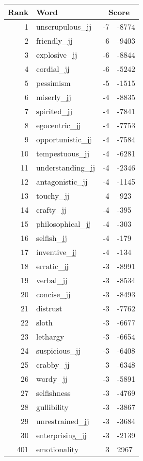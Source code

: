 \begin{longtable}[!htbp]{| rlr@{.}l |}
    \hline
    \textbf{Rank} & \textbf{Word} & \multicolumn{2}{c|}{\textbf{Score}} \\
    \hline
    \endhead
    1 & unscrupulous\_jj & -7 & -8774 \\
    2 & friendly\_jj & -6 & -9403 \\
    3 & explosive\_jj & -6 & -8844 \\
    4 & cordial\_jj & -6 & -5242 \\
    5 & pessimism & -5 & -1515 \\
    6 & miserly\_jj & -4 & -8835 \\
    7 & spirited\_jj & -4 & -7841 \\
    8 & egocentric\_jj & -4 & -7753 \\
    9 & opportunistic\_jj & -4 & -7584 \\
    10 & tempestuous\_jj & -4 & -6281 \\
    11 & understanding\_jj & -4 & -2346 \\
    12 & antagonistic\_jj & -4 & -1145 \\
    13 & touchy\_jj & -4 & -923 \\
    14 & crafty\_jj & -4 & -395 \\
    15 & philosophical\_jj & -4 & -303 \\
    16 & selfish\_jj & -4 & -179 \\
    17 & inventive\_jj & -4 & -134 \\
    18 & erratic\_jj & -3 & -8991 \\
    19 & verbal\_jj & -3 & -8534 \\
    20 & concise\_jj & -3 & -8493 \\
    21 & distrust & -3 & -7762 \\
    22 & sloth & -3 & -6677 \\
    23 & lethargy & -3 & -6654 \\
    24 & suspicious\_jj & -3 & -6408 \\
    25 & crabby\_jj & -3 & -6348 \\
    26 & wordy\_jj & -3 & -5891 \\
    27 & selfishness & -3 & -4769 \\
    28 & gullibility & -3 & -3867 \\
    29 & unrestrained\_jj & -3 & -3684 \\
    30 & enterprising\_jj & -3 & -2139 \\
    401 & emotionality & 3 & 2967 \\

\end{longtable}
